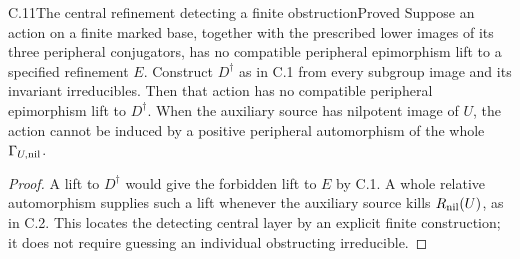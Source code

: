 \begin{statement}{C.11}{The central refinement detecting a finite obstruction}{Proved}
Suppose an action on a finite marked base, together
with the prescribed lower images of its three
peripheral conjugators, has no compatible peripheral
epimorphism lift to a specified refinement \(E\).
Construct \(D^\dagger\) as in C.1 from every
subgroup image and its invariant irreducibles.
Then that action has no compatible peripheral
epimorphism lift to \(D^\dagger\).
When the auxiliary source has nilpotent image
of \(U\), the action cannot be induced by a
positive peripheral automorphism of the whole
\(\Gamma_{U,\rm nil}\).
\end{statement}
\begin{proof}
A lift to \(D^\dagger\) would give the forbidden
lift to \(E\) by C.1.
A whole relative automorphism supplies such a
lift whenever the auxiliary source kills
\(R_{\rm nil}(U)\), as in C.2.
This locates the detecting central layer by an
explicit finite construction; it does not require
guessing an individual obstructing irreducible.
\end{proof}

